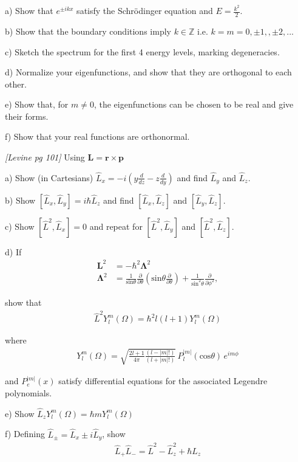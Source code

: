 a) Show that $e^{\pm ikx}$ satisfy the Schr{\"o}dinger equation and $E=\frac{k^2}{2}$.

b) Show that the boundary conditions imply
 $k\in\mathbb{Z}$ i.e. $k=m=0,\pm1,,\pm2,...$

c) Sketch the spectrum for the first 4 energy levels, marking degeneracies.

d) Normalize your eigenfunctions, and show that they are orthogonal to each other.

e) Show that, for $m\neq0$, the eigenfunctions can be chosen to be real
and give their forms.

f) Show that your real functions are orthonormal. 

\newpage
{}
{\em [Levine pg 101]}
Using $\mathbf{L} = \mathbf{r} \times \mathbf{p}$

a) Show (in Cartesians) $\hat{L}_x = -i(y\frac{d}{dz}-z\frac{d}{dy})$ and find
$\hat{L}_y$ and $\hat{L}_z$.

b) Show $[\hat{L}_x,\hat{L}_y]=i\hbar \hat{L}_z$ and find $[\hat{L}_x,\hat{L}_z]$
and $[\hat{L}_y,\hat{L}_z]$.

c) Show $[\hat{L}^2,\hat{L}_x] = 0$ and repeat for $[\hat{L}^2,\hat{L}_y]$
and $[\hat{L}^2,\hat{L}_z]$.

d) If
\begin{align*}
\mathbf{L}^2 & = -\hbar^2\mathbf{\Lambda}^2 \\
\mathbf{\Lambda}^2 & = \frac{1}{\text{sin}\theta} \frac{\partial}{\partial\theta}(\text{sin}\theta\frac{\partial}{\partial\theta})
            + \frac{1}{\text{sin}^2\theta}\frac{\partial}{\partial \phi^2},
\end{align*}

show that
\begin{align*}
\hat{L}^2Y^m_l(\Omega) = \hbar^2l(l+1)Y^m_l(\Omega)
\end{align*}

where
\begin{align*}
Y^m_l(\Omega) = \sqrt{\frac{2l+1}{4\pi}\frac{(l-|m|!)}{(l+|m|!)}}\,
            P^{|m|}_l(\text{cos}\theta)\, e^{im\phi}
\end{align*}

and $P^{|m|}_e(x)$ satisfy differential equations for the associated Legendre
polynomials.

e) Show $\hat{L}_zY^m_l(\Omega) = \hbar m Y^m_l(\Omega)$

f) Defining $\hat{L}_{\pm} = \hat{L}_x \pm i\hat{L}_y$, show
\begin{align*}
\hat{L}_+\hat{L}_- = \hat{L}^2 - \hat{L}^2_z + \hbar\hat{L}_z
\end{align*}

